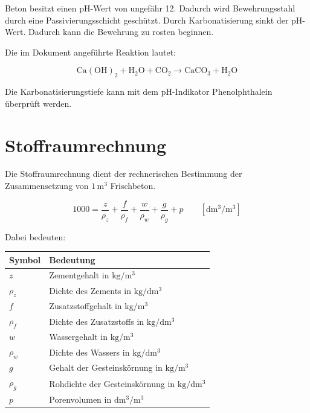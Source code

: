 \documentclass[
  12pt,
  a4paper,
  oneside
]{scrreprt}
\begin{document}
Beton besitzt einen pH-Wert von ungefähr 12. Dadurch wird
Bewehrungsstahl durch eine Passivierungsschicht geschützt. Durch
Karbonatisierung sinkt der pH-Wert. Dadurch kann die Bewehrung zu
rosten beginnen.


Die im Dokument angeführte Reaktion lautet:

\begin{equation}
  \mathrm{
  Ca(OH)_2 + H_2O + CO_2
  \rightarrow
  CaCO_3 + H_2O
  }
\end{equation}

Die Karbonatisierungstiefe kann mit dem pH-Indikator Phenolphthalein
überprüft werden.


\section{Stoffraumrechnung}

Die Stoffraumrechnung dient der rechnerischen Bestimmung der
Zusammensetzung von $1\,\mathrm{m^3}$ Frischbeton.

\begin{equation}
  1000 =
  \frac{z}{\rho_z}
  +
  \frac{f}{\rho_f}
  +
  \frac{w}{\rho_w}
  +
  \frac{g}{\rho_g}
  +
  p
  \qquad [\mathrm{dm^3/m^3}]
\end{equation}

Dabei bedeuten:

\begin{longtable}{
  >{\centering\arraybackslash}p{}
  >{\raggedright\arraybackslash}p{}
}
\toprule
\textbf{Symbol} & \textbf{Bedeutung} \\
\midrule
\endhead

$z$ & Zementgehalt in $\mathrm{kg/m^3}$ \\

$\rho_z$ & Dichte des Zements in $\mathrm{kg/dm^3}$ \\

$f$ & Zusatzstoffgehalt in $\mathrm{kg/m^3}$ \\

$\rho_f$ & Dichte des Zusatzstoffs in $\mathrm{kg/dm^3}$ \\

$w$ & Wassergehalt in $\mathrm{kg/m^3}$ \\

$\rho_w$ & Dichte des Wassers in $\mathrm{kg/dm^3}$ \\

$g$ & Gehalt der Gesteinskörnung in $\mathrm{kg/m^3}$ \\

$\rho_g$ & Rohdichte der Gesteinskörnung in $\mathrm{kg/dm^3}$ \\

$p$ & Porenvolumen in $\mathrm{dm^3/m^3}$ \\

\bottomrule
\end{longtable}
\end{document}

